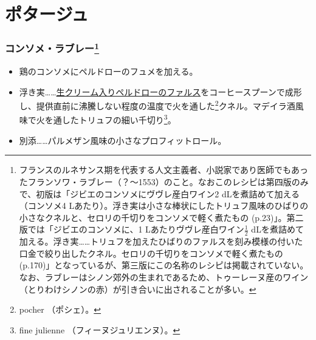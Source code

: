 \hypertarget{Potages}{%
\section{ポタージュ}\label{Potages}}
\begin{recette}
\hypertarget{consomme-rabelais}{%
\subsubsection[コンソメ・ラブレー]{\texorpdfstring{コンソメ・ラブレー\footnote{フランスのルネサンス期を代表する人文主義者、小説家であり医師でもあったフランソワ・ラブレー（？〜1553）のこと。なおこのレシピは第四版のみで、初版は「ジビエのコンソメにヴヴレ産白ワイン2
  dLを煮詰めて加える（コンソメ4
  Lあたり）。浮き実は小さな棒状にしたトリュフ風味のひばりの小さなクネルと、セロリの千切りをコンソメで軽く煮たもの
  (p.23)」。第二版では「ジビエのコンソメに、1
  Lあたりヴヴレ産白ワイン\(\frac{1}{2}\)
  dLを煮詰めて加える。浮き実\ldots{}\ldots{}トリュフを加えたひばりのファルスを刻み模様の付いた口金で絞り出したクネル。セロリの千切りをコンソメで軽く煮たもの(p.170)」となっているが、第三版にこの名称のレシピは掲載されていない。なお、ラブレーはシノン郊外の生まれであるため、トゥーレーヌ産のワイン（とりわけシノンの赤）が引き合いに出されることが多い。}}{コンソメ・ラブレー}}\label{consomme-rabelais}}

\begin{itemize}
\item
  鶏のコンソメにペルドローのフュメを加える。
\item
  浮き実\ldots{}\ldots{}\protect\hyperlink{farce-c}{生クリーム入りペルドローのファルス}をコーヒースプーンで成形し、提供直前に沸騰しない程度の温度で火を通した\footnote{pocher
    （ポシェ）。}クネル。マデイラ酒風味で火を通したトリュフの細い千切り\footnote{fine
    julienne （フィーヌジュリエンヌ）。}。
\item
  別添\ldots{}\ldots{}パルメザン風味の小さなプロフィットロール。
\end{itemize}

\hypertarget{puree-conde}{%
}
\end{recette}
